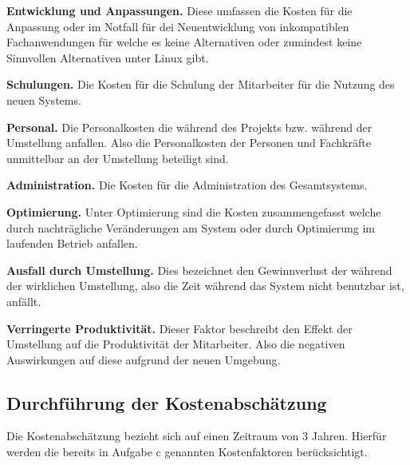 \documentclass[12pt,utf8]{scrartcl}
\begin{document}
\textbf{Entwicklung und Anpassungen.} Diese umfassen die Kosten für die Anpassung oder im Notfall für dei Neuentwicklung von inkompatiblen Fachanwendungen für welche es keine Alternativen oder zumindest keine Sinnvollen Alternativen unter Linux gibt.
\newline

\textbf{Schulungen.} Die Kosten für die Schulung der Mitarbeiter für die Nutzung des neuen Systems.
\newline

\textbf{Personal.} Die Personalkosten die während des Projekts bzw. während der Umstellung anfallen. Also die Personalkosten der Personen und Fachkräfte unmittelbar an der Umstellung beteiligt sind.
\newline

\textbf{Administration.} Die Kosten für die Administration des Gesamtsystems.
\newline

\textbf{Optimierung.} Unter Optimierung sind die Kosten zusammengefasst welche durch nachträgliche Veränderungen am System oder durch Optimierung im laufenden Betrieb anfallen.
\newline

\textbf{Ausfall durch Umstellung.} Dies bezeichnet den Gewinnverlust der während der wirklichen Umstellung, also die Zeit während das System nicht benutzbar ist, anfällt.
\newline

\textbf{Verringerte Produktivität.} Dieser Faktor beschreibt den Effekt der Umstellung auf die Produktivität der Mitarbeiter. Also die negativen Auswirkungen auf diese aufgrund der neuen Umgebung.
\newpage

\subsection*{Durchführung der Kostenabschätzung}

Die Kostenabschätzung bezieht sich auf einen Zeitraum von 3 Jahren. Hierfür werden die bereits in Aufgabe c genannten Kostenfaktoren berücksichtigt.
\end{document}
